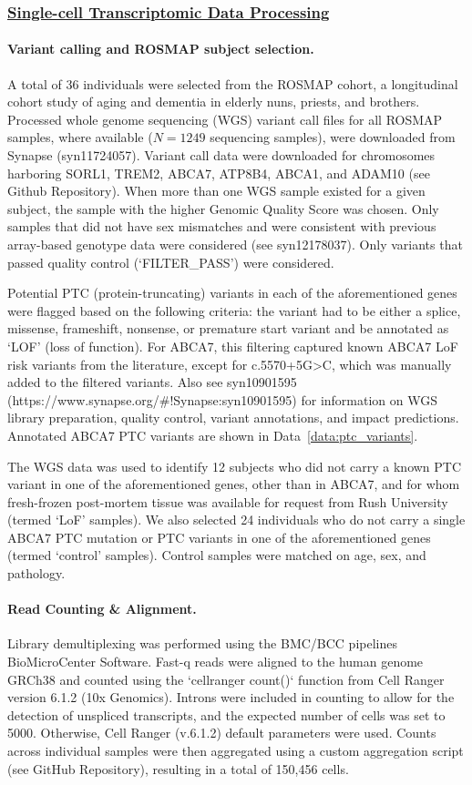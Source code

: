 \subsubsection{\underline{Single-cell Transcriptomic Data Processing}}

\paragraph{Variant calling and ROSMAP subject selection.}
A total of 36 individuals were selected from the ROSMAP cohort, a longitudinal cohort study of aging and dementia in elderly nuns, priests, and brothers. Processed whole genome sequencing (WGS) variant call files for all ROSMAP samples, where available ($N=1249$ sequencing samples), were downloaded from Synapse (syn11724057). Variant call data were downloaded for chromosomes harboring SORL1, TREM2, ABCA7, ATP8B4, ABCA1, and ADAM10 (see Github Repository). When more than one WGS sample existed for a given subject, the sample with the higher Genomic Quality Score was chosen. Only samples that did not have sex mismatches and were consistent with previous array-based genotype data were considered (see syn12178037). Only variants that passed quality control (‘FILTER_PASS’) were considered.

Potential PTC (protein-truncating) variants in each of the aforementioned genes were flagged based on the following criteria: the variant had to be either a splice, missense, frameshift, nonsense, or premature start variant and be annotated as ‘LOF’ (loss of function). For ABCA7, this filtering captured known ABCA7 LoF risk variants from the literature, except for c.5570+5G>C, which was manually added to the filtered variants. Also see syn10901595 (https://www.synapse.org/\#!Synapse:syn10901595) for information on WGS library preparation, quality control, variant annotations, and impact predictions. Annotated ABCA7 PTC variants are shown in Data~\ref{data:ptc_variants}.

The WGS data was used to identify 12 subjects who did not carry a known PTC variant in one of the aforementioned genes, other than in ABCA7, and for whom fresh-frozen post-mortem tissue was available for request from Rush University (termed ‘LoF’ samples). We also selected 24 individuals who do not carry a single ABCA7 PTC mutation or PTC variants in one of the aforementioned genes (termed ‘control’ samples). Control samples were matched on age, sex, and pathology. 

\paragraph{Read Counting & Alignment.}
Library demultiplexing was performed using the BMC/BCC pipelines BioMicroCenter Software. Fast-q reads were aligned to the human genome GRCh38 and counted using the `cellranger count()` function from Cell Ranger version 6.1.2 (10x Genomics). Introns were included in counting to allow for the detection of unspliced transcripts, and the expected number of cells was set to 5000. Otherwise, Cell Ranger (v.6.1.2) default parameters were used. Counts across individual samples were then aggregated using a custom aggregation script (see GitHub Repository), resulting in a total of 150,456 cells.

